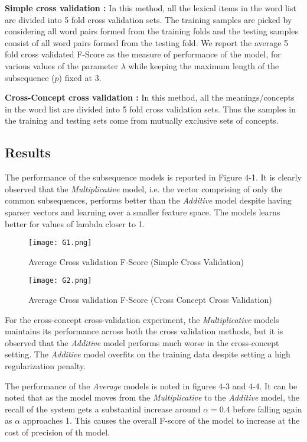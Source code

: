 \textbf{Simple cross validation :} In this method, all the lexical items in the word list are divided into 5 fold cross validation sets. The training samples are picked by considering all word pairs formed from the training folds and the testing samples consist of all word pairs formed from the testing fold. We report the average 5 fold cross validated F-Score as the measure of performance of the model, for various values of the parameter $\lambda$ while keeping the maximum length of the subsequence ($p$) fixed at 3.

\textbf{Cross-Concept cross validation :} In this method, all the meanings/concepts in the word list are divided into 5 fold cross validation sets. Thus the samples in the training and testing sets come from mutually exclusive sets of concepts.

\subsection{Results}

The performance of the subsequence models is reported in Figure 4-1. It is clearly observed that the \textit{Multiplicative} model, i.e. the vector comprising of only the common subsequences, performs better than the \textit{Additive} model despite having sparser vectors and learning over a smaller feature space. The models learns better for values of lambda closer to 1. 

\begin{figure}[ht]
\centering
\texttt{[image: G1.png]}
\caption{Average Cross validation F-Score (Simple Cross Validation)}
\end{figure}

\begin{figure}[ht]
\centering
\texttt{[image: G2.png]}
\caption{Average Cross validation F-Score (Cross Concept Cross Validation)}
\end{figure}

For the cross-concept cross-validation experiment, the \textit{Multiplicative} models maintains its performance across both the cross validation methods, but it is observed that the \textit{Additive} model performs much worse in the cross-concept setting. The \textit{Additive} model overfits on the training data despite setting a high regularization penalty.

The performance of the \textit{Average} models is noted in figures 4-3 and 4-4. It can be noted that as the model moves from the \textit{Multiplicative} to the \textit{Additive} model, the recall of the system gets a substantial increase around $\alpha = 0.4$ before falling again as $\alpha$ approaches 1. This causes the overall F-score of the model to increase at the cost of precision of th model. 

